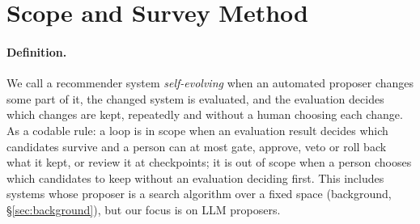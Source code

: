 \documentclass[sigconf,nonacm]{acmart}
\begin{document}
\section{Scope and Survey Method}\label{sec:method}

\paragraph{Definition.} We call a recommender system \emph{self-evolving} when an automated proposer changes some
part of it, the changed system is evaluated, and the evaluation decides which changes are kept, repeatedly and
without a human choosing each change. As a codable rule: a loop is in scope when an evaluation result decides which
candidates survive and a person can at most gate, approve, veto or roll back what it kept, or review it at checkpoints;
it is out of scope when a person chooses which candidates to keep without an evaluation deciding first. This includes systems whose proposer is a search algorithm over a fixed space (background,
\S\ref{sec:background}), but our focus is on LLM proposers.
\end{document}
